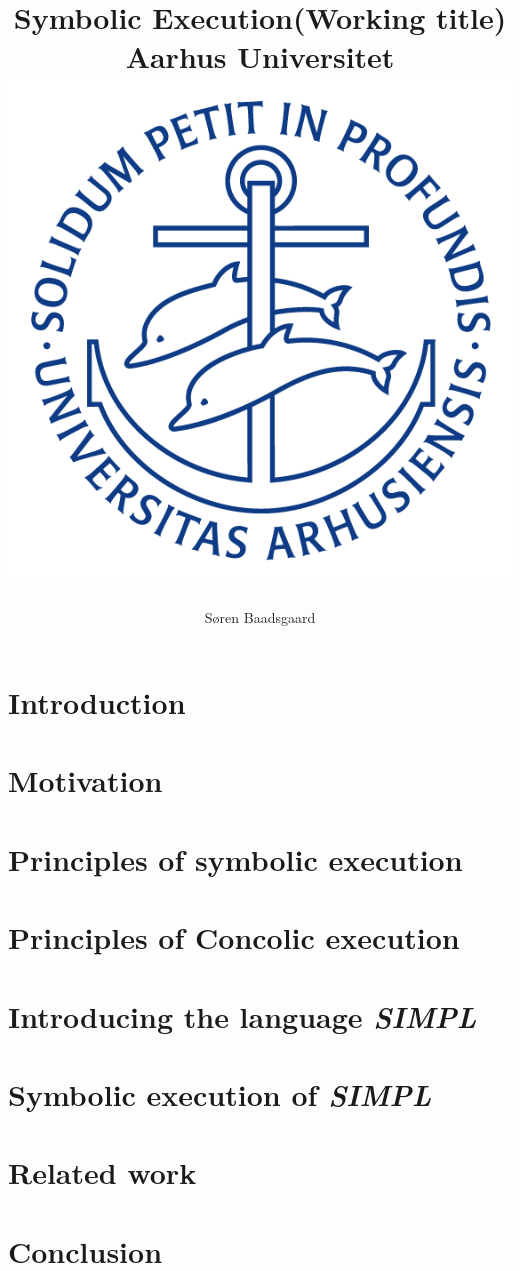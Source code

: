 \documentclass[]{report}
\title{
	\textbf{Symbolic Execution(Working title)}\\
	{\large Aarhus Universitet}\\
	{\includegraphics[scale=0.5]{ausegl_blaa.png}}	
	}
\author{Søren Baadsgaard}
\newcommand{\explanguage}{\textsl{SIMPL }}
\begin{document}
\maketitle

\begin{abstract}
	
\end{abstract}

\tableofcontents

\chapter{Introduction}
	
	
\chapter{Motivation}
	
\chapter{Principles of symbolic execution}
	
\chapter{Principles of Concolic execution}
	
\chapter{Introducing the language \explanguage}
	
\chapter{Symbolic execution of \explanguage}
	
\chapter{Related work}
	
\chapter{Conclusion}
	

\appendix



\end{document}
